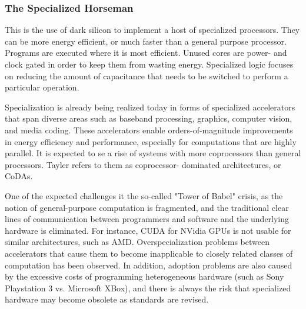 
\subsubsection{The Specialized Horseman}
This is the use of dark silicon to implement a host of specialized processors\cite{dark-silicon}.
They can be more energy efficient, or much faster than a general purpose processor.
Programs are executed where it is most efficient.
Unused cores are power- and clock gated in order to keep them from wasting energy.
Specialized logic focuses on reducing the amount of capacitance that needs to be switched to perform a particular operation.

Specialization is already being realized today in forms of specialized accelerators that span diverse areas such as baseband processing, graphics, computer vision, and media coding.
These accelerators enable orders-of-magnitude improvements in energy efficiency and performance, especially for computations that are highly parallel.
It is expected to se a rise of systems with more coprocessors than general processors.
Tayler refers to them as coprocessor- dominated architectures, or CoDAs.

One of the expected challenges it the so-called "Tower of Babel" crisis, as the notion of general-purpose computation is fragmented, and the traditional clear lines of communication between programmers and software and the underlying hardware is eliminated.
For instance, CUDA for NVidia GPUs is not usable for similar architectures, such as AMD.
Overspecialization problems between accelerators that cause them to become inapplicable to closely related classes of computation has been observed.
In addition, adoption problems are also caused by the excessive costs of programming heterogeneous hardware (such as Sony Playstation 3 vs. Microsoft XBox), and there is always the risk that specialized hardware may become obsolete as standards are revised.

